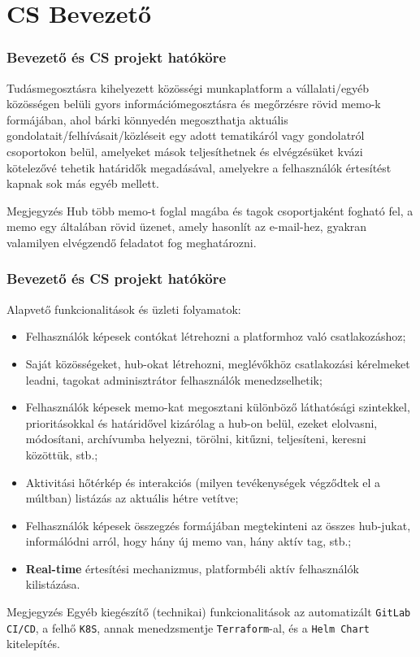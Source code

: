 \section{CS Bevezető}

\begin{frame}
    \frametitle{Bevezető és CS projekt hatóköre}

    Tudásmegosztásra kihelyezett közösségi munkaplatform a vállalati/egyéb közösségen belüli gyors információmegosztásra és megőrzésre rövid memo-k formájában, ahol bárki könnyedén megoszthatja aktuális gondolatait/felhívásait/közléseit egy adott tematikáról vagy gondolatról csoportokon belül, amelyeket mások teljesíthetnek és elvégzésüket kvázi kötelezővé tehetik határidők megadásával, amelyekre a felhasználók értesítést kapnak sok más egyéb mellett.

    \medbreak

    \begin{block}{Megjegyzés}
        Hub több memo-t foglal magába és tagok csoportjaként fogható fel, a memo egy általában rövid üzenet, amely hasonlít az e-mail-hez, gyakran valamilyen elvégzendő feladatot fog meghatározni.
    \end{block}
\end{frame}

\begin{frame}
    \frametitle{Bevezető és CS projekt hatóköre}

    Alapvető funkcionalitások és üzleti folyamatok:
    \begin{itemize}
        \item Felhasználók képesek contókat létrehozni a platformhoz való csatlakozáshoz;
        \item Saját közösségeket, hub-okat létrehozni, meglévőkhöz csatlakozási kérelmeket leadni, tagokat adminisztrátor felhasználók menedzselhetik;
        \item Felhasználók képesek memo-kat megosztani különböző láthatósági szintekkel, prioritásokkal és határidővel kizárólag a hub-on belül, ezeket elolvasni, módosítani, archívumba helyezni, törölni, kitűzni, teljesíteni, keresni közöttük, stb.;
        \item Aktivitási hőtérkép és interakciós (milyen tevékenységek végződtek el a múltban) listázás az aktuális hétre vetítve;
        \item Felhasználók képesek összegzés formájában megtekinteni az összes hub-jukat, informálódni arról, hogy hány új memo van, hány aktív tag, stb.;
        \item \textbf{Real-time} értesítési mechanizmus, platformbéli aktív felhasználók kilistázása.
    \end{itemize}

    \begin{block}{Megjegyzés}
        Egyéb kiegészítő (technikai) funkcionalitások az automatizált \texttt{GitLab CI/CD}, a felhő \texttt{K8S}, annak menedzsmentje \texttt{Terraform}-al, és a \texttt{Helm Chart} kitelepítés.
    \end{block}
\end{frame}